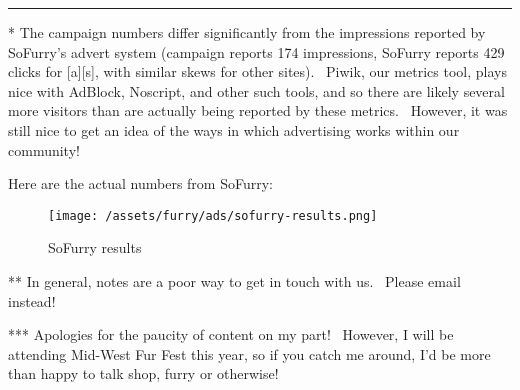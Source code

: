 \begin{center}\rule{0.5\linewidth}{\linethickness}\end{center}

* The campaign numbers differ significantly from the impressions
reported by SoFurry's advert system (campaign reports 174 impressions,
SoFurry reports 429 clicks for {[}a{]}{[}s{]}, with similar skews for
other sites). ~Piwik, our metrics tool, plays nice with AdBlock,
Noscript, and other such tools, and so there are likely several more
visitors than are actually being reported by these metrics. ~However, it
was still nice to get an idea of the ways in which advertising works
within our community!

Here are the actual numbers from SoFurry:

\begin{figure}[htbp]
\centering
\texttt{[image: /assets/furry/ads/sofurry-results.png]}
\caption{SoFurry results}
\end{figure}

** In general, notes are a poor way to get in touch with us. ~Please
email instead!

*** Apologies for the paucity of content on my part! ~However, I will be
attending Mid-West Fur Fest this year, so if you catch me around, I'd be
more than happy to talk shop, furry or otherwise!
